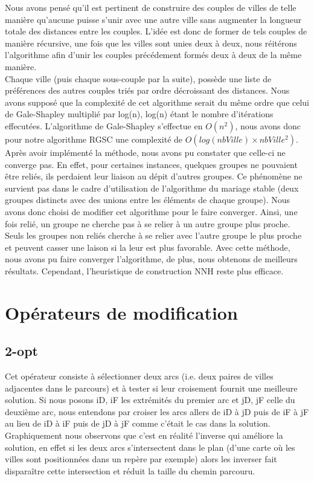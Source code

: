 \documentclass[12pt,a4paper]{article}
\begin{document}
Nous avons pensé qu'il est pertinent de construire des couples de villes de telle manière qu'aucune puisse s'unir avec une autre ville sans augmenter la longueur totale des distances entre les couples. L'idée est donc de former de tels couples de manière récursive, une fois que les villes sont unies deux à deux, nous réitérons l'algorithme afin d'unir les couples précédement formés deux à deux de la même manière.\\

Chaque ville (puis chaque sous-couple par la suite), possède une liste de préférences des autres couples triés par ordre décroissant des distances. Nous avons supposé que la complexité de cet algorithme serait du même ordre que celui de Gale-Shapley multiplié par log(n), log(n) étant le nombre d'itérations effecutées. L'algorithme de Gale-Shapley s'effectue en $O(n^2)$, nous avons donc pour notre algorithme RGSC une complexité de $O(log(nbVille) \times nbVille ^2)$.\\

Après avoir implémenté la méthode, nous avons pu constater que celle-ci ne converge pas. En effet, pour certaines instances, quelques groupes ne pouvaient être reliés, ils perdaient leur liaison au dépit d'autres groupes. Ce phénomène ne survient pas dans le cadre d'utilisation de l'algorithme du mariage stable (deux groupes distincts avec des unions entre les éléments de chaque groupe). Nous avons donc choisi de modifier cet algorithme pour le faire converger. Ainsi, une fois relié, un groupe ne cherche pas à se relier à un autre groupe plus proche. Seuls les groupes non reliés cherche à se relier avec l'autre groupe le plus proche et peuvent casser une laison si la leur est plus favorable. Avec cette méthode, nous avons pu faire converger l'algorithme, de plus, nous obtenons de meilleurs résultats. Cependant, l'heuristique de construction NNH reste plus efficace.\\
\section{Opérateurs de modification}

\subsection{2-opt}
Cet opérateur consiste à sélectionner deux arcs (i.e. deux paires de villes adjacentes dans le parcours) et à tester si leur croisement fournit une meilleure solution. Si nous posons iD, iF les extrémités du premier arc et jD, jF celle du deuxième arc, nous entendons par croiser les arcs allers de iD à jD puis de iF à jF au lieu de iD à iF puis de jD à jF comme c’était le cas dans la solution. Graphiquement nous observons que c'est en réalité l'inverse qui améliore la solution, en effet si les deux arcs s’intersectent dans le plan (d'une carte où les villes sont positionnées dans un repère par exemple) alors les inverser fait disparaître cette intersection et réduit la taille du chemin parcouru.\\
\end{document}
